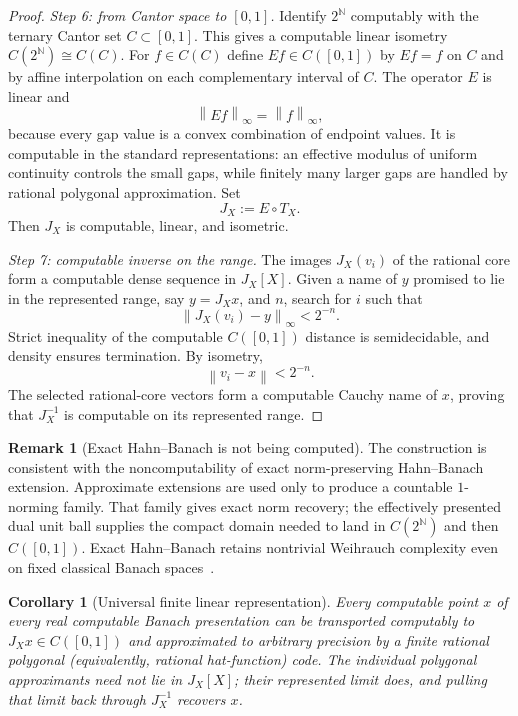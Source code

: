 \documentclass[11pt]{article}
\newtheorem{corollary}[theorem]{Corollary}
\theoremstyle{definition}
\newtheorem{remark}[theorem]{Remark}
\newcommand{\norm}[1]{\left\lVert #1 \right\rVert}
\newcommand{\N}{\mathbb{N}}
\begin{document}
\begin{proof}
\smallskip
\noindent\emph{Step 6: from Cantor space to $[0,1]$.}
Identify $2^{\N}$ computably with the ternary Cantor set $C\subset[0,1]$.  This gives a
computable linear isometry $C(2^{\N})\cong C(C)$.  For $f\in C(C)$ define $Ef\in C([0,1])$
by $Ef=f$ on $C$ and by affine interpolation on each complementary interval of $C$.
The operator $E$ is linear and
\[
 \norm{Ef}_{\infty}=\norm f_{\infty},
\]
because every gap value is a convex combination of endpoint values.  It is computable in
the standard representations: an effective modulus of uniform continuity controls the
small gaps, while finitely many larger gaps are handled by rational polygonal
approximation.  Set
\[
 J_X:=E\circ T_X.
\]
Then $J_X$ is computable, linear, and isometric.

\smallskip
\noindent\emph{Step 7: computable inverse on the range.}
The images $J_X(v_i)$ of the rational core form a computable dense sequence in $J_X[X]$.
Given a name of $y$ promised to lie in the represented range, say $y=J_Xx$, and $n$, search for $i$ such that
\[
 \norm{J_X(v_i)-y}_{\infty}<2^{-n}.
\]
Strict inequality of the computable $C([0,1])$ distance is semidecidable, and density
ensures termination.  By isometry,
\[
 \norm{v_i-x}<2^{-n}.
\]
The selected rational-core vectors form a computable Cauchy name of $x$, proving that
$J_X^{-1}$ is computable on its represented range.
\end{proof}

\begin{remark}[Exact Hahn--Banach is not being computed]
The construction is consistent with the noncomputability of exact norm-preserving
Hahn--Banach extension.  Approximate extensions are used only to produce a countable
$1$-norming family.  That family gives exact norm recovery; the effectively presented dual
unit ball supplies the compact domain needed to land in $C(2^{\N})$ and then $C([0,1])$.  Exact Hahn--Banach retains nontrivial Weihrauch complexity even
on fixed classical Banach spaces~\cite{BrattkaSorg2026}.
\end{remark}

\begin{corollary}[Universal finite linear representation]\label{cor:finite-linear}
Every computable point $x$ of every real computable Banach presentation can be transported
computably to $J_Xx\in C([0,1])$ and approximated to arbitrary precision by a finite
rational polygonal (equivalently, rational hat-function) code.  The individual polygonal approximants need not lie in $J_X[X]$; their represented
limit does, and pulling that limit back through $J_X^{-1}$ recovers $x$.
\end{corollary}
\end{document}
